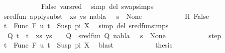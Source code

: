 \begin{isabellebody}
\ \ \ \ \ \ \ \ \ \ \isamarkupfalse%
\ False\ var{\isacharunderscore}{\kern0pt}{}{\isacharunderscore}{\kern0pt}sred\ \isamarkupfalse%
\ {\isacharparenleft}{\kern0pt}simp\ del{\isacharcolon}{\kern0pt}\ swap{\isachardot}{\kern0pt}simps{\isacharparenright}{\kern0pt}\isanewline
\ \ \ \ \ \ \ \ \isamarkupfalse%
\ {\isachardoublequoteopen}sred{\isacharunderscore}{\kern0pt}fun\ {\isacharparenleft}{\kern0pt}apply{\isacharunderscore}{\kern0pt}subst\ {\isacharquery}{\kern0pt}{\isasymsigma}\ {\isacharparenleft}{\kern0pt}xs{\isacharcomma}{\kern0pt}\ ys{\isacharparenright}{\kern0pt}{\isacharcomma}{\kern0pt}\ nabla{\isacharcomma}{\kern0pt}\ {\isacharquery}{\kern0pt}{\isasymsigma}\ {\isasymbullet}\ s{\isacharparenright}{\kern0pt}\ {\isacharequal}{\kern0pt}\ None{\isachardoublequoteclose}\isanewline
\ \ \ \ \ \ \ \ \ \ \isamarkupfalse%
\ H\ False\ \isamarkupfalse%
\ {\isacartoucheopen}t{}\ {\isacharequal}{\kern0pt}\ Func\ F\ u{\isacartoucheclose}\ {\isacartoucheopen}t{}\ {\isacharequal}{\kern0pt}\ Susp\ pi\ X{\isacartoucheclose}\ \isamarkupfalse%
\ {\isacharparenleft}{\kern0pt}simp\ del{\isacharcolon}{\kern0pt}\ sred{\isacharunderscore}{\kern0pt}fun{\isachardot}{\kern0pt}simps{\isacharparenright}{\kern0pt}\isanewline
\ \ \ \ \ \ \ \ \isamarkupfalse%
\ \isamarkupfalse%
\ {\isachardoublequoteopen}{\isasymexists}{\isasymsigma}\ Q{\isachardot}{\kern0pt}\ {\isacharparenleft}{\kern0pt}{\isacharparenleft}{\kern0pt}t{}\ {\isasymapprox}{\isacharquery}{\kern0pt}\ t{}{\isacharparenright}{\kern0pt}\ {\isacharhash}{\kern0pt}\ xs{\isacharcomma}{\kern0pt}\ ys{\isacharparenright}{\kern0pt}\ {\isasymturnstile}\ {\isasymsigma}\ {\isasymleadsto}\ Q\ {\isasymand}\ sred{\isacharunderscore}{\kern0pt}fun\ {\isacharparenleft}{\kern0pt}Q{\isacharcomma}{\kern0pt}\ nabla{\isacharcomma}{\kern0pt}\ {\isasymsigma}\ {\isasymbullet}\ s{\isacharparenright}{\kern0pt}\ {\isacharequal}{\kern0pt}\ None{\isachardoublequoteclose}\isanewline
\ \ \ \ \ \ \ \ \ \ \isamarkupfalse%
\ step\ \isamarkupfalse%
\ {\isacartoucheopen}t{}\ {\isacharequal}{\kern0pt}\ Func\ F\ u{\isacartoucheclose}\ {\isacartoucheopen}t{}\ {\isacharequal}{\kern0pt}\ Susp\ pi\ X{\isacartoucheclose}\ \isamarkupfalse%
\ blast\isanewline
\ \ \ \ \ \ \ \ \isamarkupfalse%
\ \isamarkupfalse%
\ {\isacharquery}{\kern0pt}thesis\ \isamarkupfalse%

\end{isabellebody}

